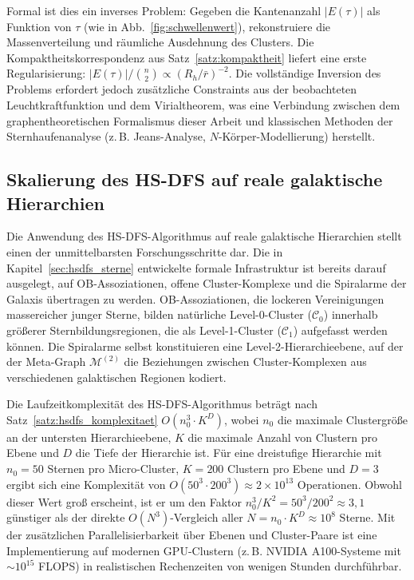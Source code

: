 ﻿\documentclass[a4paper,12pt]{report}
\theoremstyle{definition}
\begin{document}
Formal ist dies ein inverses Problem: Gegeben die Kantenanzahl $|E(\tau)|$ als Funktion von $\tau$ (wie in Abb.~\ref{fig:schwellenwert}), rekonstruiere die Massenverteilung und räumliche Ausdehnung des Clusters. Die Kompaktheitskorrespondenz aus Satz~\ref{satz:kompaktheit} liefert eine erste Regularisierung: $|E(\tau)| / \binom{n}{2} \propto (R_h / \bar{r})^{-2}$. Die vollständige Inversion des Problems erfordert jedoch zusätzliche Constraints aus der beobachteten Leuchtkraftfunktion und dem Virialtheorem, was eine Verbindung zwischen dem graphentheoretischen Formalismus dieser Arbeit und klassischen Methoden der Sternhaufenanalyse (z.\,B. Jeans-Analyse, $N$-Körper-Modellierung) herstellt.


\subsection{Skalierung des HS-DFS auf reale galaktische Hierarchien}

Die Anwendung des HS-DFS-Algorithmus auf reale galaktische Hierarchien stellt einen der unmittelbarsten Forschungsschritte dar. Die in Kapitel~\ref{sec:hsdfs_sterne} entwickelte formale Infrastruktur ist bereits darauf ausgelegt, auf OB-Assoziationen, offene Cluster-Komplexe und die Spiralarme der Galaxis übertragen zu werden. OB-Assoziationen, die lockeren Vereinigungen massereicher junger Sterne, bilden natürliche Level-0-Cluster ($\mathcal{C}_0$) innerhalb größerer Sternbildungsregionen, die als Level-1-Cluster ($\mathcal{C}_1$) aufgefasst werden können. Die Spiralarme selbst konstituieren eine Level-2-Hierarchieebene, auf der der Meta-Graph $\mathcal{M}^{(2)}$ die Beziehungen zwischen Cluster-Komplexen aus verschiedenen galaktischen Regionen kodiert.

Die Laufzeitkomplexität des HS-DFS-Algorithmus beträgt nach Satz~\ref{satz:hsdfs_komplexitaet} $O(n_0^3 \cdot K^D)$, wobei $n_0$ die maximale Clustergröße an der untersten Hierarchieebene, $K$ die maximale Anzahl von Clustern pro Ebene und $D$ die Tiefe der Hierarchie ist. Für eine dreistufige Hierarchie mit $n_0 = 50$ Sternen pro Micro-Cluster, $K = 200$ Clustern pro Ebene und $D = 3$ ergibt sich eine Komplexität von $O(50^3 \cdot 200^3) \approx 2 \times 10^{13}$ Operationen. Obwohl dieser Wert groß erscheint, ist er um den Faktor $n_0^3 / K^2 = 50^3 / 200^2 \approx 3{,}1$ günstiger als der direkte $O(N^3)$-Vergleich aller $N = n_0 \cdot K^D \approx 10^8$ Sterne. Mit der zusätzlichen Parallelisierbarkeit über Ebenen und Cluster-Paare ist eine Implementierung auf modernen GPU-Clustern (z.\,B. NVIDIA A100-Systeme mit $\sim 10^{15}$ FLOPS) in realistischen Rechenzeiten von wenigen Stunden durchführbar.
\end{document}
